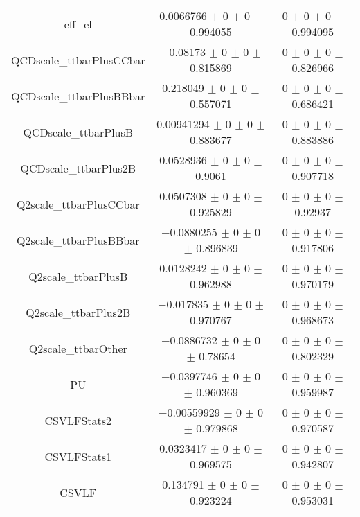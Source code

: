 \begin{table}
\begin{tabular}{ccc}
eff\_el 	& \num{0.0066766} $\pm$ \num{0} $\pm$ \num{0} $\pm$ \num{0.994055} 	& \num{0} $\pm$ \num{0} $\pm$ \num{0} $\pm$ \num{0.994095}\\
QCDscale\_ttbarPlusCCbar 	& \num{-0.08173} $\pm$ \num{0} $\pm$ \num{0} $\pm$ \num{0.815869} 	& \num{0} $\pm$ \num{0} $\pm$ \num{0} $\pm$ \num{0.826966}\\
QCDscale\_ttbarPlusBBbar 	& \num{0.218049} $\pm$ \num{0} $\pm$ \num{0} $\pm$ \num{0.557071} 	& \num{0} $\pm$ \num{0} $\pm$ \num{0} $\pm$ \num{0.686421}\\
QCDscale\_ttbarPlusB 	& \num{0.00941294} $\pm$ \num{0} $\pm$ \num{0} $\pm$ \num{0.883677} 	& \num{0} $\pm$ \num{0} $\pm$ \num{0} $\pm$ \num{0.883886}\\
QCDscale\_ttbarPlus2B 	& \num{0.0528936} $\pm$ \num{0} $\pm$ \num{0} $\pm$ \num{0.9061} 	& \num{0} $\pm$ \num{0} $\pm$ \num{0} $\pm$ \num{0.907718}\\
Q2scale\_ttbarPlusCCbar 	& \num{0.0507308} $\pm$ \num{0} $\pm$ \num{0} $\pm$ \num{0.925829} 	& \num{0} $\pm$ \num{0} $\pm$ \num{0} $\pm$ \num{0.92937}\\
Q2scale\_ttbarPlusBBbar 	& \num{-0.0880255} $\pm$ \num{0} $\pm$ \num{0} $\pm$ \num{0.896839} 	& \num{0} $\pm$ \num{0} $\pm$ \num{0} $\pm$ \num{0.917806}\\
Q2scale\_ttbarPlusB 	& \num{0.0128242} $\pm$ \num{0} $\pm$ \num{0} $\pm$ \num{0.962988} 	& \num{0} $\pm$ \num{0} $\pm$ \num{0} $\pm$ \num{0.970179}\\
Q2scale\_ttbarPlus2B 	& \num{-0.017835} $\pm$ \num{0} $\pm$ \num{0} $\pm$ \num{0.970767} 	& \num{0} $\pm$ \num{0} $\pm$ \num{0} $\pm$ \num{0.968673}\\
Q2scale\_ttbarOther 	& \num{-0.0886732} $\pm$ \num{0} $\pm$ \num{0} $\pm$ \num{0.78654} 	& \num{0} $\pm$ \num{0} $\pm$ \num{0} $\pm$ \num{0.802329}\\
PU 	& \num{-0.0397746} $\pm$ \num{0} $\pm$ \num{0} $\pm$ \num{0.960369} 	& \num{0} $\pm$ \num{0} $\pm$ \num{0} $\pm$ \num{0.959987}\\
CSVLFStats2 	& \num{-0.00559929} $\pm$ \num{0} $\pm$ \num{0} $\pm$ \num{0.979868} 	& \num{0} $\pm$ \num{0} $\pm$ \num{0} $\pm$ \num{0.970587}\\
CSVLFStats1 	& \num{0.0323417} $\pm$ \num{0} $\pm$ \num{0} $\pm$ \num{0.969575} 	& \num{0} $\pm$ \num{0} $\pm$ \num{0} $\pm$ \num{0.942807}\\
CSVLF 	& \num{0.134791} $\pm$ \num{0} $\pm$ \num{0} $\pm$ \num{0.923224} 	& \num{0} $\pm$ \num{0} $\pm$ \num{0} $\pm$ \num{0.953031}\\

\end{tabular}
\end{table}

